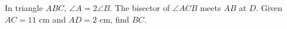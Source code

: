 In triangle $ABC$, $\angle A=2\angle B$. The bisector of $\angle ACB$ meets $AB$ at $D$. Given $AC=11$ cm and $AD=2$ cm, find $BC$.
